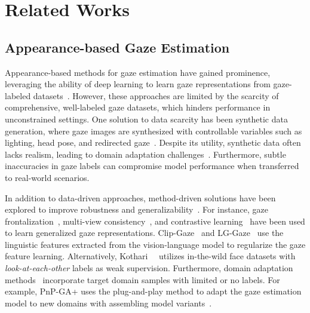 \section{Related Works}
\label{sec:related}

\subsection{Appearance-based Gaze Estimation}
Appearance-based methods for gaze estimation have gained prominence, leveraging the ability of deep learning to learn gaze representations from gaze-labeled datasets~\cite{zhang2015appearance,mpii_zhang19_pami,zhang2020eth,kellnhofer2019gaze360,krafka2016eye,funes2014eyediap,fischer2018rt}.
However, these approaches are limited by the scarcity of comprehensive, well-labeled gaze datasets, which hinders performance in unconstrained settings.
One solution to data scarcity has been synthetic data generation, where gaze images are synthesized with controllable variables such as lighting, head pose, and redirected gaze~\cite{qin2022learning,zheng2020self,jin2023redirtrans,ruzzi2023gazenerf,wang2023high_nerf,yin2022nerfgaze}. 
Despite its utility, synthetic data often lacks realism, leading to domain adaptation challenges~\cite{wood2015rendering,kim2019nvgaze}. 
Furthermore, subtle inaccuracies in gaze labels can compromise model performance when transferred to real-world scenarios.


In addition to data-driven approaches, method-driven solutions have been explored to improve robustness and generalizability~\cite{yin2024clip,liu2024gaze,bao2024feature,cheng2022puregaze,zhao2024improving,xu2023learning}.
For instance, gaze frontalization~\cite{xu2024gaze}, multi-view consistency~\cite{hisadome2024rotation,bao2024unsupervised}, and contrastive learning~\cite{he2020momentum,jindal2023contrastive} have been used to learn generalized gaze representations.
Clip-Gaze~\cite{yin2024clip} and LG-Gaze~\cite{yin2024lggaze} use the linguistic features extracted from the vision-language model to regularize the gaze feature learning.
Alternatively, Kothari~\etal~\cite{kothari2021weakly} utilizes in-the-wild face datasets with \textit{look-at-each-other} labels as weak supervision.
Furthermore, domain adaptation methods~\cite{park2019few,wang2022contrastive} incorporate target domain samples with limited or no labels.
For example, PnP-GA+ uses the plug-and-play method to adapt the gaze estimation model to new domains with assembling model variants~\cite{liu2024pnp}.


